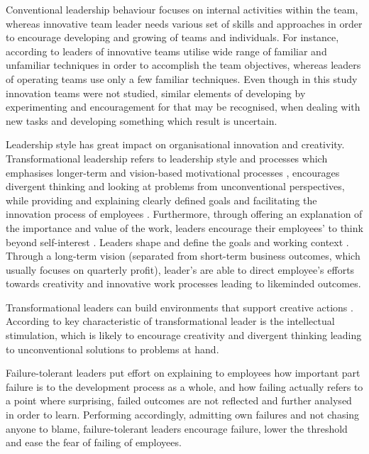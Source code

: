 Conventional leadership behaviour focuses on internal activities within the team, whereas innovative team leader needs various set of skills and approaches in order to encourage developing and growing of teams and individuals. For instance, according to \citet{barczak1989leadership} leaders of innovative teams utilise wide range of familiar and unfamiliar techniques in order to accomplish the team objectives, whereas leaders of operating teams use only a few familiar techniques. Even though in this study innovation teams were not studied, similar elements of developing by experimenting and encouragement for that may be recognised, when dealing with new tasks and developing something which result is uncertain. 

Leadership style has great impact on organisational innovation and creativity. Transformational leadership refers to leadership style and processes which emphasises longer-term and vision-based motivational processes \citep{bass1997full}, encourages divergent thinking and looking at problems from unconventional perspectives, while providing and explaining clearly defined goals and facilitating the innovation process of employees \citep{bass1990implications}. Furthermore, through offering an explanation of the importance and value of the work, leaders encourage their employees' to think beyond self-interest \citep{yukl2002leadership}. Leaders shape and define the goals and working context \citep{amabile1998kill, redmond1993putting}. Through a long-term vision (separated from short-term business outcomes, which usually focuses on quarterly profit), leader's are able to direct employee's efforts towards creativity and innovative work processes leading to likeminded outcomes\citep{amabile1996assessing}. 

Transformational leaders can build environments that support creative actions \citep{sosik1998transformational,avolio1988transformational}. According to \citet{sosik1998transformational} key characteristic of transformational leader is the intellectual stimulation, which is likely to encourage creativity and divergent thinking leading to unconventional solutions to problems at hand. 

Failure-tolerant leaders put effort on explaining to employees how important part failure is to the development process as a whole, and how failing actually refers to a point where surprising, failed outcomes are not reflected and further analysed in order to learn. Performing accordingly, admitting own failures and not chasing anyone to blame, failure-tolerant leaders encourage failure, lower the threshold and ease the fear of failing of employees. \citep{farson2002failuretolerantleader}

